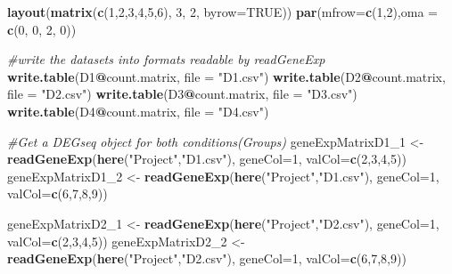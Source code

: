 \documentclass[]{article}
\newenvironment{Shaded}{\begin{snugshade}}{\end{snugshade}}
\newcommand{\CommentTok}[1]{\textcolor[rgb]{0.56,0.35,0.01}{\textit{#1}}}
\newcommand{\DataTypeTok}[1]{\textcolor[rgb]{0.13,0.29,0.53}{#1}}
\newcommand{\DecValTok}[1]{\textcolor[rgb]{0.00,0.00,0.81}{#1}}
\newcommand{\KeywordTok}[1]{\textcolor[rgb]{0.13,0.29,0.53}{\textbf{#1}}}
\newcommand{\NormalTok}[1]{#1}
\newcommand{\OperatorTok}[1]{\textcolor[rgb]{0.81,0.36,0.00}{\textbf{#1}}}
\newcommand{\OtherTok}[1]{\textcolor[rgb]{0.56,0.35,0.01}{#1}}
\newcommand{\StringTok}[1]{\textcolor[rgb]{0.31,0.60,0.02}{#1}}
\begin{document}
\begin{Shaded}
\begin{Highlighting}[]
\KeywordTok{layout}\NormalTok{(}\KeywordTok{matrix}\NormalTok{(}\KeywordTok{c}\NormalTok{(}\DecValTok{1}\NormalTok{,}\DecValTok{2}\NormalTok{,}\DecValTok{3}\NormalTok{,}\DecValTok{4}\NormalTok{,}\DecValTok{5}\NormalTok{,}\DecValTok{6}\NormalTok{), }\DecValTok{3}\NormalTok{, }\DecValTok{2}\NormalTok{, }\DataTypeTok{byrow=}\OtherTok{TRUE}\NormalTok{))}
\KeywordTok{par}\NormalTok{(}\DataTypeTok{mfrow=}\KeywordTok{c}\NormalTok{(}\DecValTok{1}\NormalTok{,}\DecValTok{2}\NormalTok{),}\DataTypeTok{oma =} \KeywordTok{c}\NormalTok{(}\DecValTok{0}\NormalTok{, }\DecValTok{0}\NormalTok{, }\DecValTok{2}\NormalTok{, }\DecValTok{0}\NormalTok{))}

\CommentTok{#write the datasets into formats readable by readGeneExp}
\KeywordTok{write.table}\NormalTok{(D1}\OperatorTok{@}\NormalTok{count.matrix, }\DataTypeTok{file =} \StringTok{"D1.csv"}\NormalTok{)}
\KeywordTok{write.table}\NormalTok{(D2}\OperatorTok{@}\NormalTok{count.matrix, }\DataTypeTok{file =} \StringTok{"D2.csv"}\NormalTok{)}
\KeywordTok{write.table}\NormalTok{(D3}\OperatorTok{@}\NormalTok{count.matrix, }\DataTypeTok{file =} \StringTok{"D3.csv"}\NormalTok{)}
\KeywordTok{write.table}\NormalTok{(D4}\OperatorTok{@}\NormalTok{count.matrix, }\DataTypeTok{file =} \StringTok{"D4.csv"}\NormalTok{)}

\CommentTok{#Get a DEGseq object for both conditions(Groups)}
\NormalTok{geneExpMatrixD1_}\DecValTok{1}\NormalTok{ <-}\StringTok{ }\KeywordTok{readGeneExp}\NormalTok{(}\KeywordTok{here}\NormalTok{(}\StringTok{"Project"}\NormalTok{,}\StringTok{"D1.csv"}\NormalTok{), }\DataTypeTok{geneCol=}\DecValTok{1}\NormalTok{, }\DataTypeTok{valCol=}\KeywordTok{c}\NormalTok{(}\DecValTok{2}\NormalTok{,}\DecValTok{3}\NormalTok{,}\DecValTok{4}\NormalTok{,}\DecValTok{5}\NormalTok{))}
\NormalTok{geneExpMatrixD1_}\DecValTok{2}\NormalTok{ <-}\StringTok{ }\KeywordTok{readGeneExp}\NormalTok{(}\KeywordTok{here}\NormalTok{(}\StringTok{"Project"}\NormalTok{,}\StringTok{"D1.csv"}\NormalTok{), }\DataTypeTok{geneCol=}\DecValTok{1}\NormalTok{, }\DataTypeTok{valCol=}\KeywordTok{c}\NormalTok{(}\DecValTok{6}\NormalTok{,}\DecValTok{7}\NormalTok{,}\DecValTok{8}\NormalTok{,}\DecValTok{9}\NormalTok{))}

\NormalTok{geneExpMatrixD2_}\DecValTok{1}\NormalTok{ <-}\StringTok{ }\KeywordTok{readGeneExp}\NormalTok{(}\KeywordTok{here}\NormalTok{(}\StringTok{"Project"}\NormalTok{,}\StringTok{"D2.csv"}\NormalTok{), }\DataTypeTok{geneCol=}\DecValTok{1}\NormalTok{, }\DataTypeTok{valCol=}\KeywordTok{c}\NormalTok{(}\DecValTok{2}\NormalTok{,}\DecValTok{3}\NormalTok{,}\DecValTok{4}\NormalTok{,}\DecValTok{5}\NormalTok{))}
\NormalTok{geneExpMatrixD2_}\DecValTok{2}\NormalTok{ <-}\StringTok{ }\KeywordTok{readGeneExp}\NormalTok{(}\KeywordTok{here}\NormalTok{(}\StringTok{"Project"}\NormalTok{,}\StringTok{"D2.csv"}\NormalTok{), }\DataTypeTok{geneCol=}\DecValTok{1}\NormalTok{, }\DataTypeTok{valCol=}\KeywordTok{c}\NormalTok{(}\DecValTok{6}\NormalTok{,}\DecValTok{7}\NormalTok{,}\DecValTok{8}\NormalTok{,}\DecValTok{9}\NormalTok{))}


\end{Highlighting}
\end{Shaded}
\end{document}
